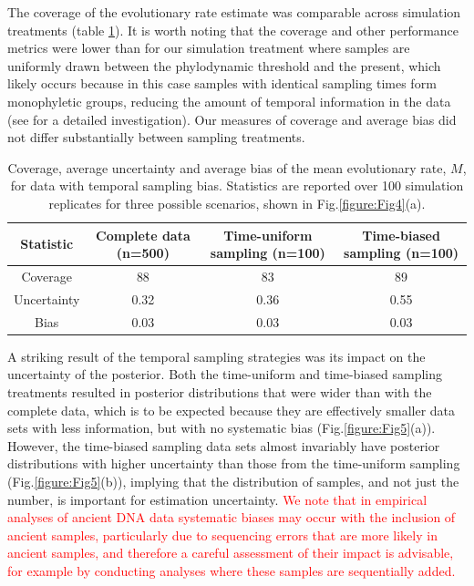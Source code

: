 \documentclass[11pt]{article}
\begin{document}
The coverage of the evolutionary rate estimate was comparable across simulation treatments (table \ref{table:sampling_bias}). It is worth noting that the coverage and other performance metrics were lower than for our simulation treatment where samples are uniformly drawn between the phylodynamic threshold and the present, which likely occurs because in this case samples with identical sampling times form monophyletic groups, reducing the amount of temporal information in the data (see \citealt{murray2016effect} for a detailed investigation). Our measures of coverage and average bias did not differ substantially between sampling treatments. 

\begin{table}[H]
	\caption{Coverage, average uncertainty and average bias of the mean evolutionary rate, $M$, for data with temporal sampling bias. Statistics are reported over 100 simulation replicates for three possible scenarios, shown in Fig.\ref{figure:Fig4}(a).} 
	\begin{center}
		\label{table:sampling_bias}
		\begin{tabular}{ c|c|c|c }
		 Statistic & Complete data (n=500) & Time-uniform sampling (n=100) & Time-biased sampling (n=100) \\ 
		\hline
		Coverage 	& 88   & 83   & 89 \\ 
		Uncertainty & 0.32 & 0.36 & 0.55 \\
		Bias 		& 0.03 & 0.03 & 0.03 \\ 
		\end{tabular}
	\end{center}
\end{table}

A striking result of the temporal sampling strategies was its impact on the uncertainty of the posterior. Both the time-uniform and time-biased sampling treatments resulted in posterior distributions that were wider than with the complete data, which is to be expected because they are effectively smaller data sets with less information, but with no systematic bias (Fig.\ref{figure:Fig5}(a)). However, the time-biased sampling data sets almost invariably have posterior distributions with higher uncertainty than those from the time-uniform sampling (Fig.\ref{figure:Fig5}(b)), implying that the distribution of samples, and not just the number, is important for estimation uncertainty. \textcolor{red}{We note that in empirical analyses of ancient DNA data systematic biases may occur with the inclusion of ancient samples, particularly due to sequencing errors that are more likely in ancient samples, and therefore a careful assessment of their impact is advisable, for example by conducting analyses where these samples are sequentially added.}
\end{document}
